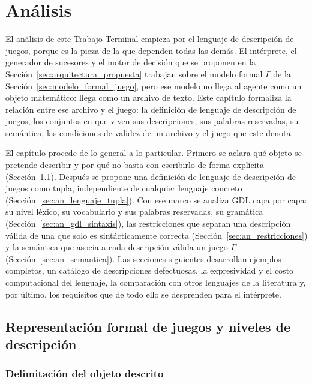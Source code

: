 \chapter{Análisis}
\label{ch:analisis}

El análisis de este Trabajo Terminal empieza por el lenguaje de descripción de juegos, porque es la pieza de la que dependen todas las demás. El intérprete, el generador de sucesores y el motor de decisión que se proponen en la Sección~\ref{sec:arquitectura_propuesta} trabajan sobre el modelo formal $\Gamma$ de la Sección~\ref{sec:modelo_formal_juego}, pero ese modelo no llega al agente como un objeto matemático: llega como un archivo de texto. Este capítulo formaliza la relación entre ese archivo y el juego: la definición de lenguaje de descripción de juegos, los conjuntos en que viven sus descripciones, sus palabras reservadas, su semántica, las condiciones de validez de un archivo y el juego que este denota.

El capítulo procede de lo general a lo particular. Primero se aclara qué objeto se pretende describir y por qué no basta con escribirlo de forma explícita (Sección~\ref{sec:an_objeto}). Después se propone una definición de lenguaje de descripción de juegos como tupla, independiente de cualquier lenguaje concreto (Sección~\ref{sec:an_lenguaje_tupla}). Con ese marco se analiza GDL capa por capa: su nivel léxico, su vocabulario y sus palabras reservadas, su gramática (Sección~\ref{sec:an_gdl_sintaxis}), las restricciones que separan una descripción válida de una que solo es sintácticamente correcta (Sección~\ref{sec:an_restricciones}) y la semántica que asocia a cada descripción válida un juego $\Gamma$ (Sección~\ref{sec:an_semantica}). Las secciones siguientes desarrollan ejemplos completos, un catálogo de descripciones defectuosas, la expresividad y el costo computacional del lenguaje, la comparación con otros lenguajes de la literatura y, por último, los requisitos que de todo ello se desprenden para el intérprete.

\section{Representación formal de juegos y niveles de descripción}
\label{sec:an_objeto}

\subsection{Delimitación del objeto descrito}

